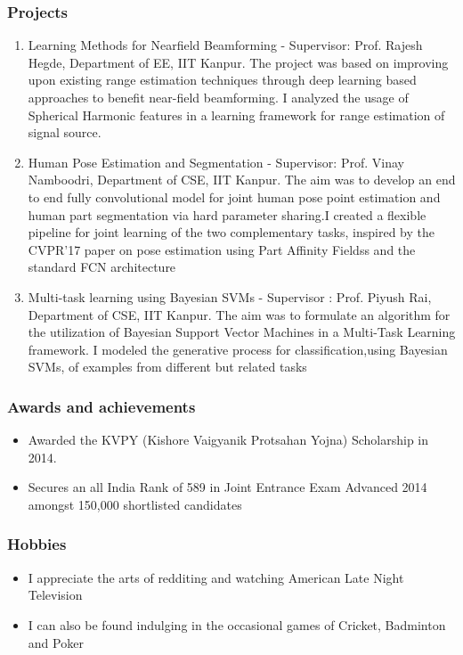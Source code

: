 \documentclass{article}
\begin{document}
\subsubsection*{Projects}
\begin{enumerate}
    \item Learning Methods for Nearfield Beamforming - Supervisor: Prof. Rajesh Hegde, Department of EE, IIT Kanpur. The project was based on improving upon existing range estimation techniques through deep learning based approaches to benefit near-field beamforming. I analyzed the usage of Spherical Harmonic features in a learning framework for range estimation of signal source.
    \item Human Pose Estimation and Segmentation - Supervisor: Prof. Vinay Namboodri, Department of CSE, IIT Kanpur. The aim was to develop an end to end fully convolutional model for joint human pose point estimation  and human part segmentation via hard parameter sharing.I created a flexible pipeline for joint learning of the two complementary tasks, inspired by the CVPR'17 paper on pose estimation using Part Affinity Fieldss and the standard FCN architecture
    \item Multi-task learning using Bayesian SVMs - Supervisor : Prof. Piyush Rai, Department of CSE, IIT Kanpur. The aim was to formulate an algorithm for the utilization of Bayesian Support Vector Machines in a Multi-Task Learning framework. I modeled the generative process for classification,using Bayesian SVMs, of examples from different but related tasks
\end{enumerate}

\subsubsection*{Awards and achievements}

\renewcommand{\labelitemi}{$\textendash$}
\begin{itemize}
    \item Awarded the KVPY (Kishore Vaigyanik Protsahan Yojna) Scholarship in 2014.
    \item Secures an all India Rank of 589 in Joint Entrance Exam Advanced 2014 amongst 150,000 shortlisted candidates
\end{itemize}

\subsubsection*{Hobbies}
\renewcommand{\labelitemi}{$\textendash$}
\begin{itemize}
    \item I appreciate the arts of redditing and watching American Late Night Television
    \item I can also be found indulging in the occasional games of Cricket, Badminton and Poker 
\end{itemize}
\end{document}
